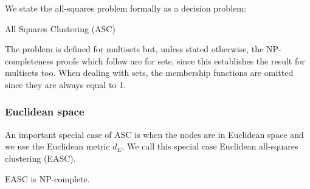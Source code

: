 We state the all-squares problem formally as a decision problem:
\begin{problem}{All Squares Clustering (ASC)}
    
\end{problem}

The problem is defined for multisets but, unless stated otherwise, the
NP-completeness proofs which follow are for sets, since this establishes the
result for multisets too.  When dealing with sets, the membership functions
are omitted since they are always equal to 1.


\subsubsection{Euclidean space}
\label{sec:euclidean-space}

An important special case of ASC is when the nodes are in Euclidean space and
we use the Euclidean metric $d_E$.  We call this special case Euclidean
all-squares clustering (EASC).

\begin{thm}
  EASC is NP-complete.
\end{thm}

